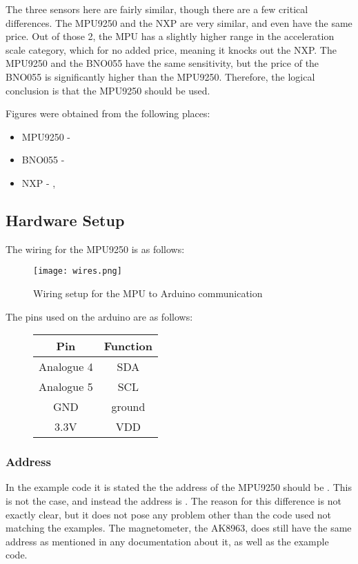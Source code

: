 The three sensors here are fairly similar, though there are a few critical differences.
The MPU9250 and the NXP are very similar, and even have the same price.
Out of those 2, the MPU has a slightly higher range in the acceleration scale category, which for no added price, meaning it knocks out the NXP.
The MPU9250 and the BNO055 have the same sensitivity, but the price of the BNO055 is significantly higher than the MPU9250.
Therefore, the logical conclusion is that the MPU9250 should be used.

Figures were obtained from the following places:
\begin{itemize}
\item MPU9250 - \cite{mpu}
\item BNO055  - \cite{bno}
\item NXP - \cite{nxp1} , \cite{nxp2}
\end{itemize}


\subsection{Hardware Setup}
The wiring for the MPU9250 is as follows:

\begin{figure}[H]
\centering
\texttt{[image: wires.png]}
\caption{Wiring setup for the MPU to Arduino communication}
\label{fig::wiring}
\end{figure}

The pins used on the arduino are as follows: 
\begin{figure}[H]
\centering
\begin{tabular}{|c|c|}
\hline
\textbf{Pin} & \textbf{Function} \\ \hline
Analogue 4 & SDA     \\ \hline
Analogue 5 & SCL     \\ \hline
GND        & ground  \\ \hline
3.3V       & VDD     \\ \hline
\end{tabular}
\end{figure}

\subsubsection{Address}
In the example code it is stated the the address of the MPU9250 should be .
This is not the case, and instead the address is .
The reason for this difference is not exactly clear, but it does not pose any problem other than the code used not matching the examples.
The magnetometer, the AK8963, does still have the same address as mentioned in any documentation about it, as well as the example code.


